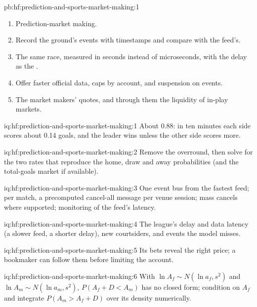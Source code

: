 \begin{solution}{pb:hf:prediction-and-sports-market-making:1}
\begin{enumerate}
\item Prediction-market making.
\item Record the ground's events with timestamps and compare with the feed's.
\item The same race, measured in seconds instead of microseconds, with the delay as the .
\item Offer faster official data, caps by account, and suspension on events.
\item The market makers' quotes, and through them the liquidity of in-play markets.
\end{enumerate}
\end{solution}

\begin{solution}{iq:hf:prediction-and-sports-market-making:1}
About 0.88: in ten minutes each side scores about 0.14 goals, and the leader wins unless the other side scores more.
\end{solution}

\begin{solution}{iq:hf:prediction-and-sports-market-making:2}
Remove the overround, then solve for the two rates that reproduce the home, draw and away probabilities (and the total-goals market if available).
\end{solution}

\begin{solution}{iq:hf:prediction-and-sports-market-making:3}
One event bus from the fastest feed; per match, a precomputed cancel-all message per venue session; mass cancels where supported; monitoring of the
feed's latency.
\end{solution}

\begin{solution}{iq:hf:prediction-and-sports-market-making:4}
The league's delay and data latency (a slower feed, a shorter delay), new courtsiders, and events the model misses.
\end{solution}

\begin{solution}{iq:hf:prediction-and-sports-market-making:5}
Its bets reveal the right price; a bookmaker can follow them before limiting the account.
\end{solution}

\begin{solution}{iq:hf:prediction-and-sports-market-making:6}
With $\ln A_f\sim N(\ln a_f,s^2)$ and $\ln A_m\sim N(\ln a_m,s^2)$, $P(A_f+D<A_m)$ has no closed form; condition on $A_f$ and integrate
$P(A_m>A_f+D)$ over its density numerically.
\end{solution}
